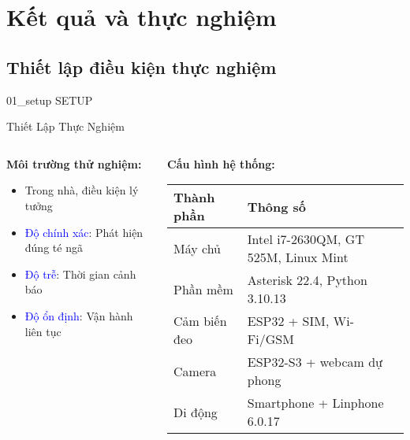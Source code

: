 \section{Kết quả và thực nghiệm}
\subsection{Thiết lập điều kiện thực nghiệm}
\begin{frame}{01\_setup}
    SETUP
\end{frame}
\begin{frame}{Thiết Lập Thực Nghiệm}
\begin{columns}[T]
\begin{column}{0.48\textwidth}

\vspace{0.3cm}
\textbf{Môi trường thử nghiệm:}
\begin{itemize}
\item Trong nhà, điều kiện lý tưởng
\item \textcolor{blue}{Độ chính xác}: Phát hiện đúng té ngã
\item \textcolor{blue}{Độ trễ}: Thời gian cảnh báo
\item \textcolor{blue}{Độ ổn định}: Vận hành liên tục
\end{itemize}
\end{column}

\begin{column}{0.52\textwidth}
\textbf{Cấu hình hệ thống:}
\begin{table}[h!]
\centering
\footnotesize
\begin{tabular}{|p{2.5cm}|p{4cm}|}
\hline
\textbf{Thành phần} & \textbf{Thông số} \\
\hline
Máy chủ & Intel i7-2630QM, GT 525M, Linux Mint \\
\hline
Phần mềm & Asterisk 22.4, Python 3.10.13 \\
\hline
Cảm biến đeo & ESP32 + SIM, Wi-Fi/GSM \\
\hline
Camera & ESP32-S3 + webcam dự phong \\
\hline
Di động & Smartphone + Linphone 6.0.17 \\
\hline
\end{tabular}
\end{table}
\end{column}
\end{columns}

\end{frame}
